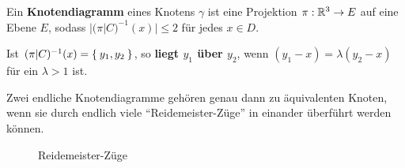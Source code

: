 \begin{definition}
    Ein \textbf{Knotendiagramm} eines Knotens $\gamma$ ist eine 
    Projektion $\pi: \mathbb{R}^3 \rightarrow E$ auf eine Ebene $E$, sodass
    $|(\pi|C)^{-1}(x)| \leq 2$ für jedes $x \in D$.

    Ist $(\pi|C)^{-1}(x) = \Set{y_1, y_2}$, so \textbf{liegt $y_1$ über $y_2$},
    wenn $(y_1-x) = \lambda (y_2 - x)$ für ein $\lambda > 1$ ist.
\end{definition}

\begin{satz}[Reidemeister]
    Zwei endliche Knotendiagramme gehören genau dann zu äquivalenten
    Knoten, wenn sie durch endlich viele \enquote{Reidemeister-Züge}
    in einander überführt werden können.
\end{satz}

\begin{figure}[htp]
    \centering
    \qquad\qquad%


    \caption{Reidemeister-Züge}
    \label{fig:reidemeister-zuege}
\end{figure}

